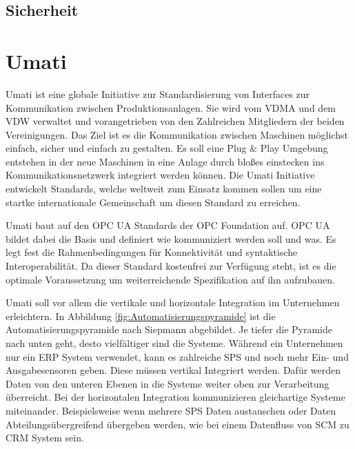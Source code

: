 \documentclass[a4paper, 12pt, oneside]{scrbook}
\begin{document}
		\subsection{Sicherheit}
		
		
	
	\section{Umati}
		
		
		Umati ist eine globale Initiative zur Standardisierung von Interfaces zur Kommunikation zwischen Produktionsanlagen. Sie wird vom \ac{VDMA} und dem \ac{VDW} verwaltet und vorangetrieben von den Zahlreichen Mitgliedern der beiden Vereinigungen. Das Ziel ist es die Kommunikation zwischen Maschinen möglichst einfach, sicher und einfach zu gestalten. Es soll eine Plug \& Play Umgebung entstehen in der neue Maschinen in eine Anlage durch bloßes einstecken ins Kommunikationsnetzwerk integriert werden können. Die Umati Initiative entwickelt Standards, welche weltweit zum Einsatz kommen sollen um eine startke internationale Gemeinschaft um diesen Standard zu erreichen. \cite{noauthor_umati_2023}
		
		Umati baut auf den OPC UA Standards der OPC Foundation auf. OPC UA bildet dabei die Basis und definiert wie kommuniziert werden soll und was. Es legt fest die Rahmenbedingungen für Konnektivität und syntaktische Interoperabilität. Da dieser Standard kostenfrei zur Verfügung steht, ist es die optimale Voraussetzung um weiterreichende Spezifikation auf ihn aufzubauen. \cite{noauthor_umati_2023}
		
		Umati soll vor allem die vertikale und horizontale Integration im Unternehmen erleichtern. In Abbildung \ref{fig:Automatisierungspyramide} ist die Automatisierungspyramide nach Siepmann abgebildet. Je tiefer die Pyramide nach unten geht, desto vielfältiger sind die Systeme. Während ein Unternehmen nur ein \ac{ERP} System verwendet, kann es zahlreiche SPS und noch mehr Ein- und Ausgabesensoren geben. Diese müssen vertikal Integriert werden. Dafür werden Daten von den unteren Ebenen in die Systeme weiter oben zur Verarbeitung überreicht. Bei der horizontalen Integration kommunizieren gleichartige Systeme miteinander. Beispielsweise wenn mehrere SPS Daten austauschen oder Daten Abteilungsübergreifend übergeben werden, wie bei einem Datenfluss von SCM zu CRM System sein. 
		
\end{document}
